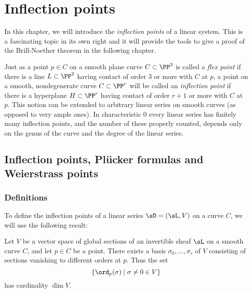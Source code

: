 

\chapter{Inflection points}\label{inflections chapter}
\label{InflectionsChapter}


In this chapter, we will introduce the \emph{inflection points} of a linear system.  This is a fascinating topic in its own right and it will provide the tools to give a proof of the Brill-Noether theorem in the following chapter.

Just as a point $p \in C$ on a smooth plane curve $C \subset \PP^2$ is called a \emph{flex point} if there is a line $L \subset \PP^2$ having contact of order 3 or more with $C$ at $p$, a point on a smooth, nondegenerate curve $C \subset \PP^r$ will be called an \emph{inflection point} if there is a hyperplane $H \subset \PP^r$ having contact of order $r+1$ or more with $C$ at $p$. This notion can be extended to arbitrary linear series on smooth curves (as opposed to very ample ones). In characteristic 0 every linear series has finitely many inflection points, and the number of these properly counted, depends only on the genus of the curve and the degree of the linear series.


\section{Inflection points,  Pl\"ucker formulas and Weierstrass points}

\subsection{Definitions}
To define the inflection points of a linear series $\sD = (\sL, V)$ on a curve $C$, we will use the following result:

\begin{proposition}\label{vanishing sequence} Let $V$ be a vector space of global sections of an invertible sheaf $\sL$ on a smooth curve $C$, and let $p \in C$ be a point. There exists a basis $\sigma_0, \dots, \sigma_r$ of $V$ consisting of sections vanishing to different orders at $p$. Thus the set
$$
\{ \ord_p(\sigma) \mid \sigma \neq 0 \in V \}
$$
 has cardinality $\dim V$.
\end{proposition}

